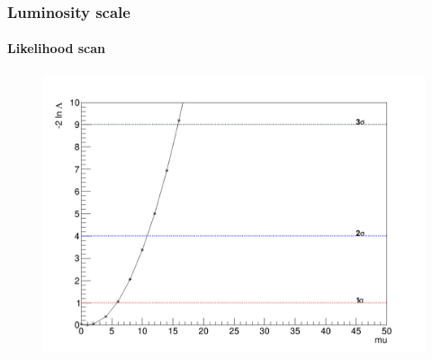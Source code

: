 \documentclass[11pt]{beamer}
\begin{document}
\begin{frame}
\frametitle{Luminosity scale}
\framesubtitle{Likelihood scan}
\begin{center}
	\begin{figure}
		\includegraphics[scale=0.25]{figures/300fb/Likelihood.png}
	\end{figure}
\end{center}
\end{frame}
\end{document}
